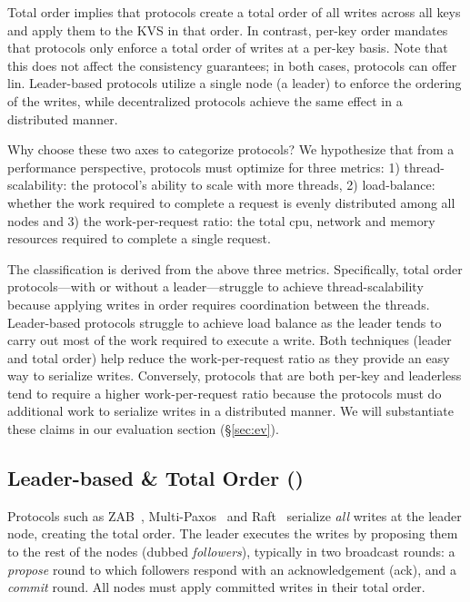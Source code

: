 \custvspace
Total order implies that protocols create a total order of all writes across all keys and apply them to the KVS in that order. In contrast, per-key order mandates that protocols only enforce a total order of writes at a per-key basis. 
Note that this does not affect the consistency guarantees;
in both cases, protocols can offer lin.
Leader-based protocols utilize a single node (\ie a leader) to enforce the ordering of the writes, while decentralized protocols achieve the same effect in a distributed manner.



Why choose these two axes to categorize protocols?
We hypothesize that from a performance perspective, protocols must optimize for three metrics: 
1) thread-scalability: the protocol's ability to scale with more threads, 
2) load-balance: whether the work required to complete a request is evenly distributed among all nodes and 
3) the work-per-request ratio: the total cpu, network and memory resources required to complete a single request.

The classification is derived from the above three metrics.
Specifically, total order protocols---with or without a leader---struggle to achieve thread-scalability because applying writes in order requires coordination between the threads. 
Leader-based protocols struggle to achieve load balance as the leader tends to carry out most of the work required to execute a write. 
Both techniques (leader and total order)
help reduce the work-per-request ratio as they provide an easy way to serialize writes.
Conversely, protocols that are both per-key and leaderless tend to require a higher work-per-request ratio because the protocols must do additional work to serialize writes in a distributed manner.
We will substantiate these claims in our evaluation section (\S\ref{sec:ev}).





\subsection{Leader-based \& Total Order (\LTO)}\label{sec:tax:lto}
Protocols such as ZAB~\cite{Hunt:2010}, Multi-Paxos~\cite{Lamport:2001} and Raft~\cite{Ongaro:2014} serialize \emph{all} writes at the leader node, creating the total order. The leader executes the writes by proposing them to the rest of the nodes (dubbed \emph{followers}), typically in two broadcast rounds: a \emph{propose} round to which followers respond with an acknowledgement (ack), and a \emph{commit} round. All nodes must apply committed writes in their total order.  

